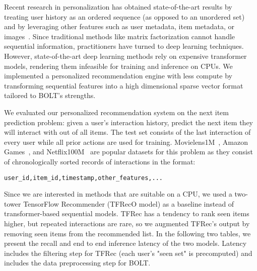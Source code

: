 \documentclass[sigconf]{acmart}
\begin{document}
Recent research in personalization has obtained state-of-the-art results by treating user history as an ordered sequence (as opposed to an unordered set) and by leveraging other features such as user metadata, item metadata, or images~\cite{sasrec, sun2019bert4rec, Rashed_2022}. Since traditional methods like matrix factorization cannot handle sequential information, practitioners have turned to deep learning techniques. However, state-of-the-art deep learning methods rely on expensive transformer models, rendering them infeasible for training and inference on CPUs. We implemented a personalized recommendation engine with less compute by transforming sequential features into a high dimensional sparse vector format tailored to BOLT’s strengths.

We evaluated our personalized recommendation system on the next item prediction problem: given a user's interaction history, predict the next item they will interact with out of all items. The test set consists of the last interaction of every user while all prior actions are used for training. Movielens1M~\cite{harper2015movielens}, Amazon Games~\cite{chin2018anr}, and Netflix100M~\cite{cremonesi2010performance} are popular datasets for this problem as they consist of chronologically sorted records of interactions in the format:

\begin{verbatim}
user_id,item_id,timestamp,other_features,...
\end{verbatim}

Since we are interested in methods that are suitable on a CPU, we used a two-tower TensorFlow Recommender (TFRecO model) as a baseline instead of transformer-based sequential models. TFRec has a tendency to rank seen items higher, but repeated interactions are rare, so we augmented TFRec's output by removing seen items from the recommended list. In the following two tables, we present the recall and end to end inference latency of the two models. Latency includes the filtering step for TFRec (each user's "seen set" is precomputed) and includes the data preprocessing step for BOLT.
\end{document}
